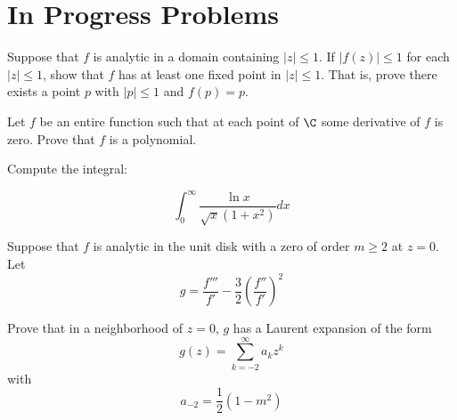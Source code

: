 \setchapterpreamble[u]{\margintoc}
\chapter{In Progress Problems}


\begin{qualproblem}[Spring 2020.C5]
    Suppose that $f$ is analytic in a domain containing $|z|\leq 1$. If $|f(z)|\leq 1$ for each $|z|\leq 1$, show that $f$ has at least one fixed point in $|z|\leq 1$. That is, prove there exists a point $p$ with $|p|\leq1$ and $f(p) = p$.


\end{qualproblem}

\begin{qualproblem}[Spring 2020.C6]
    Let $f$ be an entire function such that at each point of $\C$ some derivative of $f$ is zero. Prove that $f$ is a polynomial.

\end{qualproblem}

\begin{qualproblem}[Spring 2020.C7]
    Compute the integral:

    \[\int_0^\infty \frac{\ln x}{\sqrt{x}(1+x^2)}dx\]
    
\end{qualproblem}

\begin{qualproblem}[Spring 2020.C8]
    Suppose that $f$ is analytic in the unit disk with a zero of order $m \geq 2$ at $z=0$. Let 
        \[g = \frac{f'''}{f'} - \frac{3}{2}\left( \frac{f''}{f'} \right)^2 \]

    Prove that in a neighborhood of $z=0$, $g$ has a Laurent expansion of the form 
        \[g(z) = \sum_{k=-2}^\infty a_kz^k\]
    with
        \[a_{-2} = \frac{1}{2}(1-m^2)\]
\end{qualproblem}

